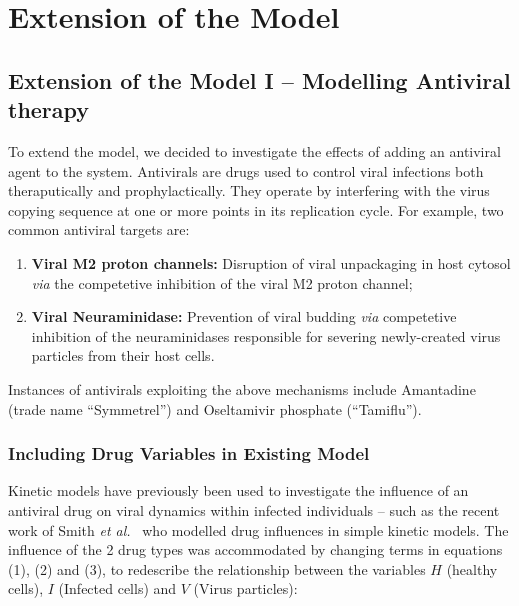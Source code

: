 \documentclass[a4paper, 12pt]{report}
\begin{document}
\chapter{Extension of the Model}
\section{Extension of the Model I -- Modelling Antiviral therapy}

To extend the model, we decided to investigate the effects of adding an antiviral agent to the system.
Antivirals are drugs used to control viral infections both theraputically and prophylactically. They operate by interfering with the virus copying sequence at one or more points in its replication cycle. For example, two common antiviral targets are:
\begin{enumerate}
\item \textbf{Viral M2 proton channels:} Disruption of viral unpackaging in host cytosol \textit{via} the competetive inhibition of the viral M2 proton channel;~\cite{Hu}
\item \textbf{Viral Neuraminidase:} Prevention of viral budding \textit{via} competetive inhibition of the neuraminidases responsible for severing newly-created virus particles from their host cells.\cite{Satoh}  
\end{enumerate}
Instances of antivirals exploiting the above mechanisms include  Amantadine (trade name ``Symmetrel'') and Oseltamivir phosphate (``Tamiflu'').\\

\subsection{Including Drug Variables in Existing Model}

Kinetic models have previously been used to investigate the influence of an antiviral drug on viral dynamics within infected individuals -- such as the recent work of Smith \textit{et al.}~\cite{Smith} who modelled drug influences in simple kinetic models.
The influence of the 2 drug types was accommodated by changing terms in equations (1), (2) and (3), to redescribe the relationship between the variables $H$ (healthy cells), $I$ (Infected cells) and $V$ (Virus particles):
\end{document}
